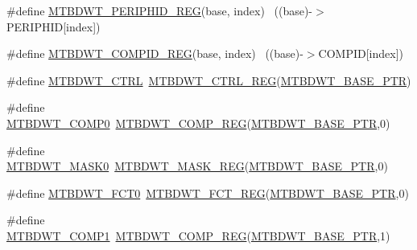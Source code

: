 \begin{DoxyCompactItemize}
\item 
\#define \hyperlink{group___m_t_b_d_w_t___register___accessor___macros_ga18a6f971f5ddf5bd0f3c5fd2d2b3b2da}{M\+T\+B\+D\+W\+T\+\_\+\+P\+E\+R\+I\+P\+H\+I\+D\+\_\+\+R\+EG}(base,  index)                ~((base)-\/$>$P\+E\+R\+I\+P\+H\+ID\mbox{[}index\mbox{]})
\item 
\#define \hyperlink{group___m_t_b_d_w_t___register___accessor___macros_gae2528012848814bf317362965a786094}{M\+T\+B\+D\+W\+T\+\_\+\+C\+O\+M\+P\+I\+D\+\_\+\+R\+EG}(base,  index)                    ~((base)-\/$>$C\+O\+M\+P\+ID\mbox{[}index\mbox{]})
\item 
\#define \hyperlink{group___m_t_b_d_w_t___register___accessor___macros_gadb4142d6299394f942ea20e3b6fae17b}{M\+T\+B\+D\+W\+T\+\_\+\+C\+T\+RL}~\hyperlink{group___m_t_b_d_w_t___register___accessor___macros_gadc89cd5cdeb4ac5157a15669485ec578}{M\+T\+B\+D\+W\+T\+\_\+\+C\+T\+R\+L\+\_\+\+R\+EG}(\hyperlink{group___m_t_b_d_w_t___peripheral_ga97d048bfb5a11293a38c444b8347ff42}{M\+T\+B\+D\+W\+T\+\_\+\+B\+A\+S\+E\+\_\+\+P\+TR})
\item 
\#define \hyperlink{group___m_t_b_d_w_t___register___accessor___macros_ga8d2e850737820e0876358db17f0bd37d}{M\+T\+B\+D\+W\+T\+\_\+\+C\+O\+M\+P0}~\hyperlink{group___m_t_b_d_w_t___register___accessor___macros_gad57476689dc41b49e09cc1ba8202f8e4}{M\+T\+B\+D\+W\+T\+\_\+\+C\+O\+M\+P\+\_\+\+R\+EG}(\hyperlink{group___m_t_b_d_w_t___peripheral_ga97d048bfb5a11293a38c444b8347ff42}{M\+T\+B\+D\+W\+T\+\_\+\+B\+A\+S\+E\+\_\+\+P\+TR},0)
\item 
\#define \hyperlink{group___m_t_b_d_w_t___register___accessor___macros_ga67bf35c31a64cd369ef04e88e3c10a18}{M\+T\+B\+D\+W\+T\+\_\+\+M\+A\+S\+K0}~\hyperlink{group___m_t_b_d_w_t___register___accessor___macros_ga5c5b8f3ae38de9e3006737c92fc2814c}{M\+T\+B\+D\+W\+T\+\_\+\+M\+A\+S\+K\+\_\+\+R\+EG}(\hyperlink{group___m_t_b_d_w_t___peripheral_ga97d048bfb5a11293a38c444b8347ff42}{M\+T\+B\+D\+W\+T\+\_\+\+B\+A\+S\+E\+\_\+\+P\+TR},0)
\item 
\#define \hyperlink{group___m_t_b_d_w_t___register___accessor___macros_ga12dedaf447e980ce1562d39e22bc7636}{M\+T\+B\+D\+W\+T\+\_\+\+F\+C\+T0}~\hyperlink{group___m_t_b_d_w_t___register___accessor___macros_gaa319e11200b9cc2fe7bfb0b5dd40d0e8}{M\+T\+B\+D\+W\+T\+\_\+\+F\+C\+T\+\_\+\+R\+EG}(\hyperlink{group___m_t_b_d_w_t___peripheral_ga97d048bfb5a11293a38c444b8347ff42}{M\+T\+B\+D\+W\+T\+\_\+\+B\+A\+S\+E\+\_\+\+P\+TR},0)
\item 
\#define \hyperlink{group___m_t_b_d_w_t___register___accessor___macros_gad33eb136896be3180b06c5ee963dc607}{M\+T\+B\+D\+W\+T\+\_\+\+C\+O\+M\+P1}~\hyperlink{group___m_t_b_d_w_t___register___accessor___macros_gad57476689dc41b49e09cc1ba8202f8e4}{M\+T\+B\+D\+W\+T\+\_\+\+C\+O\+M\+P\+\_\+\+R\+EG}(\hyperlink{group___m_t_b_d_w_t___peripheral_ga97d048bfb5a11293a38c444b8347ff42}{M\+T\+B\+D\+W\+T\+\_\+\+B\+A\+S\+E\+\_\+\+P\+TR},1)

\end{DoxyCompactItemize}
